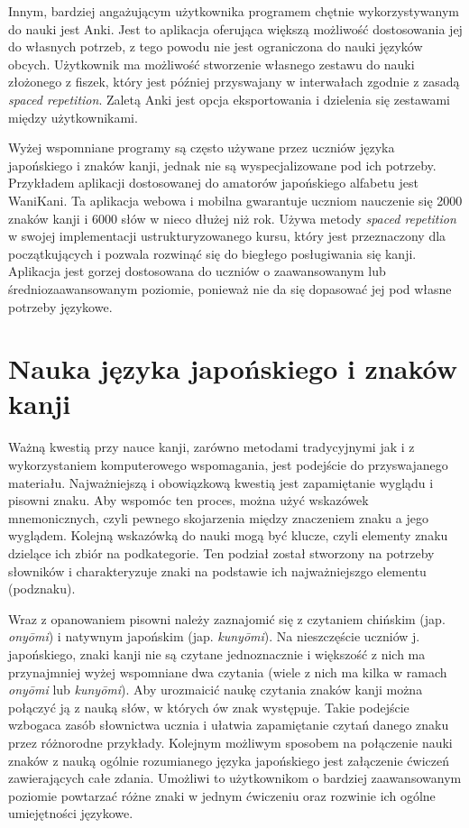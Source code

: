 \documentclass[a4paper,twoside,12pt]{book}
\begin{document}
Innym, bardziej angażującym użytkownika programem chętnie wykorzystywanym do nauki jest Anki. Jest to aplikacja oferująca większą możliwość dostosowania jej do własnych potrzeb, z tego powodu nie jest ograniczona do nauki języków obcych. Użytkownik ma możliwość stworzenie własnego zestawu do nauki złożonego z fiszek, który jest później przyswajany w interwałach zgodnie z zasadą \textit{spaced repetition}. Zaletą Anki jest opcja eksportowania i dzielenia się zestawami między użytkownikami. 

Wyżej wspomniane programy są często używane przez uczniów języka japońskiego i znaków kanji, jednak nie są wyspecjalizowane pod ich potrzeby. Przykładem aplikacji dostosowanej do amatorów japońskiego alfabetu jest WaniKani. Ta aplikacja webowa i mobilna gwarantuje uczniom nauczenie się 2000 znaków kanji i 6000 słów w nieco dłużej niż rok. Używa metody \textit{spaced repetition} w swojej implementacji ustrukturyzowanego kursu, który jest przeznaczony dla początkujących i pozwala rozwinąć się do biegłego posługiwania się kanji. Aplikacja jest gorzej dostosowana do uczniów o zaawansowanym lub średniozaawansowanym poziomie, ponieważ nie da się dopasować jej pod własne potrzeby językowe. 

\section{Nauka języka japońskiego i znaków kanji}

Ważną kwestią przy nauce kanji, zarówno metodami tradycyjnymi jak i z wykorzystaniem komputerowego wspomagania, jest podejście do przyswajanego materiału. Najważniejszą i obowiązkową kwestią jest zapamiętanie wyglądu i pisowni znaku. Aby wspomóc ten proces, można użyć wskazówek mnemonicznych, czyli pewnego skojarzenia między znaczeniem znaku a jego wyglądem.
Kolejną wskazówką do nauki mogą być klucze, czyli elementy znaku dzielące ich zbiór na podkategorie. Ten podział został stworzony na potrzeby słowników i charakteryzuje znaki na podstawie ich najważniejszgo elementu (podznaku). 

Wraz z opanowaniem pisowni należy zaznajomić się z czytaniem chińskim (jap. \textit{onyōmi}) i natywnym japońskim (jap. \textit{kunyōmi}). Na nieszczęście uczniów j. japońskiego, znaki kanji nie są czytane jednoznacznie i większość z nich ma przynajmniej wyżej wspomniane dwa czytania (wiele z nich ma kilka w ramach \textit{onyōmi} lub \textit{kunyōmi}). Aby urozmaicić naukę czytania znaków kanji można połączyć ją z nauką słów, w których ów znak występuje. Takie podejście wzbogaca zasób słownictwa ucznia i ułatwia zapamiętanie czytań danego znaku przez różnorodne przykłady. Kolejnym możliwym sposobem na połączenie nauki znaków z nauką ogólnie rozumianego języka japońskiego jest załączenie ćwiczeń zawierających całe zdania. Umożliwi to użytkownikom o bardziej zaawansowanym poziomie powtarzać różne znaki w jednym ćwiczeniu oraz rozwinie ich ogólne umiejętności językowe.
\end{document}
